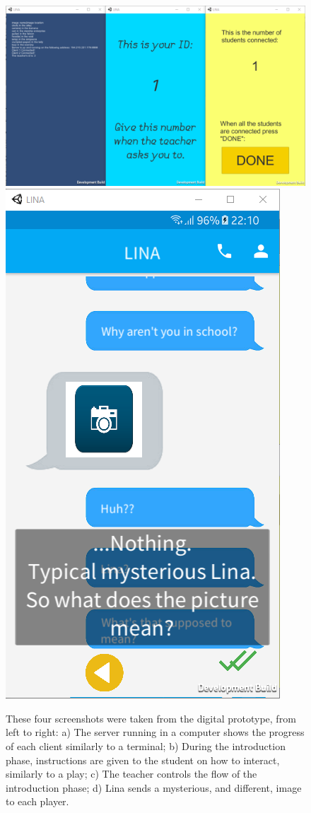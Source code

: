 \documentclass[runningheads]{llncs}
\begin{document}
\begin{figure}
    \centering
    \includegraphics[scale = 0.28]{Screenshot_28.png}
    \includegraphics[scale = 0.28]{Screenshot_30.png}
    \caption{These four screenshots were taken from the digital prototype, from left to right: a) The server running in a computer shows the progress of each client similarly to a terminal; b) During the introduction phase, instructions are given to the student on how to interact, similarly to a play; c) The teacher controls the flow of the introduction phase; d) Lina sends a mysterious, and different, image to each player.}
    \label{fig:digital}
\end{figure}
\end{document}
